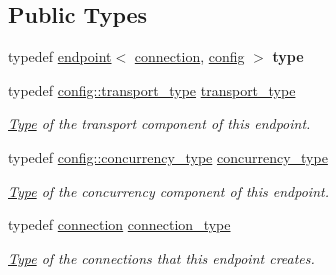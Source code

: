 \subsection*{Public Types}
\begin{DoxyCompactItemize}
\item 
\mbox{\label{classwebsocketpp_1_1endpoint_a3b2b343203819be45219dce781e8c55d}} 
typedef \mbox{\hyperlink{classwebsocketpp_1_1endpoint}{endpoint}}$<$ \mbox{\hyperlink{classwebsocketpp_1_1connection}{connection}}, \mbox{\hyperlink{classconfig}{config}} $>$ {\bfseries type}
\item 
\mbox{\label{classwebsocketpp_1_1endpoint_a8aa5190eb55c719559d2e6ea187a627b}} 
typedef \mbox{\hyperlink{classwebsocketpp_1_1transport_1_1asio_1_1endpoint}{config\+::transport\+\_\+type}} \mbox{\hyperlink{classwebsocketpp_1_1endpoint_a8aa5190eb55c719559d2e6ea187a627b}{transport\+\_\+type}}
\begin{DoxyCompactList}\small\item\em \mbox{\hyperlink{struct_type}{Type}} of the transport component of this endpoint. \end{DoxyCompactList}\item 
\mbox{\label{classwebsocketpp_1_1endpoint_a16950dc8da6e73c4aeb47f7755b63101}} 
typedef \mbox{\hyperlink{classwebsocketpp_1_1concurrency_1_1none}{config\+::concurrency\+\_\+type}} \mbox{\hyperlink{classwebsocketpp_1_1endpoint_a16950dc8da6e73c4aeb47f7755b63101}{concurrency\+\_\+type}}
\begin{DoxyCompactList}\small\item\em \mbox{\hyperlink{struct_type}{Type}} of the concurrency component of this endpoint. \end{DoxyCompactList}\item 
\mbox{\label{classwebsocketpp_1_1endpoint_a7f5908ada1bc82cb3b519e672bccdaa9}} 
typedef \mbox{\hyperlink{classwebsocketpp_1_1connection}{connection}} \mbox{\hyperlink{classwebsocketpp_1_1endpoint_a7f5908ada1bc82cb3b519e672bccdaa9}{connection\+\_\+type}}
\begin{DoxyCompactList}\small\item\em \mbox{\hyperlink{struct_type}{Type}} of the connections that this endpoint creates. \end{DoxyCompactList}\item 

\end{DoxyCompactItemize}
